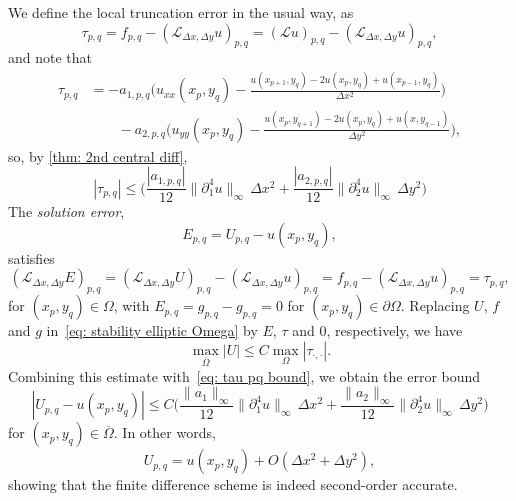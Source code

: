 We define the local truncation error in the usual way, as
\[
\tau_{p,q}=f_{p,q}-(\mathcal{L}_{\Delta x,\Delta y}u)_{p,q}
	=(\mathcal{L}u)_{p,q}-(\mathcal{L}_{\Delta x,\Delta y}u)_{p,q},
\]
and note that
\[
\begin{aligned}
\tau_{p,q}&=-a_{1,p,q}\biggl(u_{xx}(x_p,y_q)
	-\frac{u(x_{p+1},y_q)-2u(x_p,y_q)+u(x_{p-1},y_q)}{\Delta x^2}\biggr)\\
	&\qquad{}-a_{2,p,q}\biggl(u_{yy}(x_p,y_q)
	-\frac{u(x_p,y_{q+1})-2u(x_p,y_q)+u(x,y_{q-1})}{\Delta y^2}\biggr),
\end{aligned}
\]
so, by \cref{thm: 2nd central diff},
\begin{equation}\label{eq: tau pq bound}
|\tau_{p,q}|\le\biggl(
\frac{|a_{1,p,q}|}{12}\|\partial_1^4u\|_\infty\,\Delta x^2
+\frac{|a_{2,p,q}|}{12}\|\partial_2^4u\|_\infty\,\Delta y^2\biggr)
\end{equation}
The \emph{solution error},
\[
E_{p,q}=U_{p,q}-u(x_p,y_q),
\]
satisfies
\[
(\mathcal{L}_{\Delta x,\Delta y}E)_{p,q}
	=(\mathcal{L}_{\Delta x,\Delta y}U)_{p,q}
	-(\mathcal{L}_{\Delta x,\Delta y}u)_{p,q}
	=f_{p,q}-(\mathcal{L}_{\Delta x,\Delta y}u)_{p,q}=\tau_{p,q},
\]
for $(x_p,y_q)\in\Omega$, with $E_{p,q}=g_{p,q}-g_{p,q}=0$
for $(x_p,y_q)\in\partial\Omega$.  Replacing $U$, $f$ and $g$ 
in~\eqref{eq: stability elliptic Omega} by $E$, $\tau$ and $0$, respectively,
we have
\[
\max_{\overline{\Omega}}|U|\le C\max_\Omega|\tau_{\cdot,\cdot}|.
\]
Combining this estimate with~\eqref{eq: tau pq bound}, we obtain the error
bound
\[
|U_{p,q}-u(x_p,y_q)|\le C\biggl(
\frac{\|a_1\|_\infty}{12}\|\partial_1^4u\|_\infty\,\Delta x^2
+\frac{\|a_2\|_\infty}{12}\|\partial_2^4u\|_\infty\,\Delta y^2\biggr)
\]
for $(x_p,y_q)\in\overline{\Omega}$.  In other words,
\[
U_{p,q}=u(x_p,y_q)+O(\Delta x^2+\Delta y^2),
\]
showing that the finite difference scheme is indeed second-order 
accurate.

